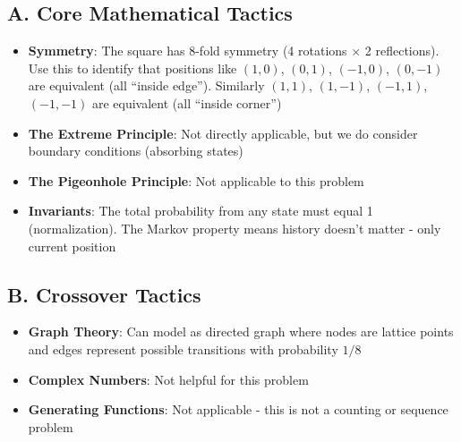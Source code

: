 \documentclass[12pt]{article}
\begin{document}
\begin{tacticalbox}

\subsection*{A. Core Mathematical Tactics}
\begin{itemize}[leftmargin=*]
    \item \textbf{Symmetry}: The square has 8-fold symmetry (4 rotations $\times$ 2 reflections). Use this to identify that positions like $(1,0)$, $(0,1)$, $(-1,0)$, $(0,-1)$ are equivalent (all ``inside edge''). Similarly $(1,1)$, $(1,-1)$, $(-1,1)$, $(-1,-1)$ are equivalent (all ``inside corner'')
    
    \item \textbf{The Extreme Principle}: Not directly applicable, but we do consider boundary conditions (absorbing states)
    
    \item \textbf{The Pigeonhole Principle}: Not applicable to this problem
    
    \item \textbf{Invariants}: The total probability from any state must equal 1 (normalization). The Markov property means history doesn't matter - only current position
\end{itemize}

\subsection*{B. Crossover Tactics}
\begin{itemize}[leftmargin=*]
    \item \textbf{Graph Theory}: Can model as directed graph where nodes are lattice points and edges represent possible transitions with probability $1/8$
    
    \item \textbf{Complex Numbers}: Not helpful for this problem
    
    \item \textbf{Generating Functions}: Not applicable - this is not a counting or sequence problem
\end{itemize}
\end{tacticalbox}
\end{document}
